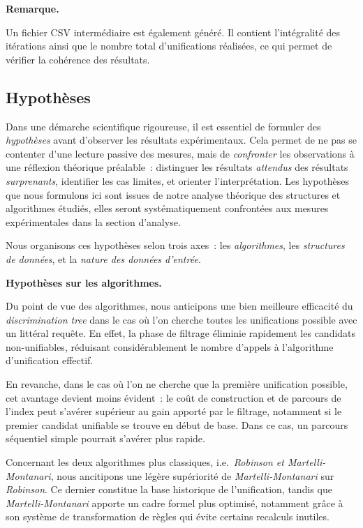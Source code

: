 \documentclass[11pt]{article}
\newenvironment{paraph}[1]{%
  \medskip
  \noindent\textbf{#1.}\quad

  \vspace{0.2cm}
}{%
  \medskip
}
\newenvironment{remarque}{%
    \begin{mdframed}[
        linecolor=sectioncolor!40,
        linewidth=0.8pt,
        backgroundcolor=sectioncolor!5,
        innerleftmargin=10pt,
        innerrightmargin=10pt,
        innertopmargin=6pt,
        innerbottommargin=6pt,
        skipabove=8pt,
        skipbelow=8pt
    ]
    \noindent\textbf{\small\color{sectioncolor}Remarque.}\enspace\small\itshape
}{%
    \end{mdframed}
}
\begin{document}
    \begin{remarque}
        Un fichier CSV intermédiaire est également généré. Il contient l'intégralité des itérations ainsi que le nombre total d'unifications réalisées, ce qui permet de vérifier la cohérence des résultats.
    \end{remarque}

\subsection{Hypothèses}
Dans une démarche scientifique rigoureuse, il est essentiel de 
formuler des \textit{hypothèses} avant d'observer les résultats 
expérimentaux. Cela permet de ne pas se contenter d'une lecture 
passive des mesures, mais de \textit{confronter} les observations 
à une réflexion théorique préalable~: distinguer les résultats 
\textit{attendus} des résultats \textit{surprenants}, identifier 
les cas limites, et orienter l'interprétation. Les hypothèses 
que nous formulons ici sont issues de notre analyse théorique 
des structures et algorithmes étudiés, elles seront 
systématiquement confrontées aux mesures expérimentales dans 
la section d'analyse.

\vspace{0.2cm}
Nous organisons ces hypothèses selon trois axes~: les 
\textit{algorithmes}, les \textit{structures de données}, 
et la \textit{nature des données d'entrée}.

\begin{paraph}{Hypothèses sur les algorithmes}
    Du point de vue des algorithmes, nous anticipons une bien meilleure efficacité
    du \textit{discrimination tree} dans le cas où l'on cherche toutes les unifications
    possible avec un littéral requête. En effet, la phase de filtrage éliminie rapidement 
    les candidats non-unifiables, réduisant considérablement le nombre d'appels à l'algorithme d'unification effectif.

    \vspace{0.2cm}
    En revanche, dans le cas où l'on ne cherche que la première unification possible, cet
    avantage devient moins évident~: le coût de construction et de parcours de l'index peut
    s'avérer supérieur au gain apporté par le filtrage, notamment si le premier candidat
    unifiable se trouve en début de base. Dans ce cas, un parcours séquentiel simple pourrait s'avérer plus rapide.

    \vspace{0.2cm}
    Concernant les deux algorithmes plus classiques, i.e.~\textit{Robinson et Martelli-Montanari},
    nous ancitipons une légère supériorité de \textit{Martelli-Montanari} sur \textit{Robinson}. Ce
    dernier constitue la base historique de l'unification, tandis que \textit{Martelli-Montanari}
    apporte un cadre formel plus optimisé, notamment grâce à son système de transformation de
    règles qui évite certains recalculs inutiles.
\end{paraph}
\end{document}
